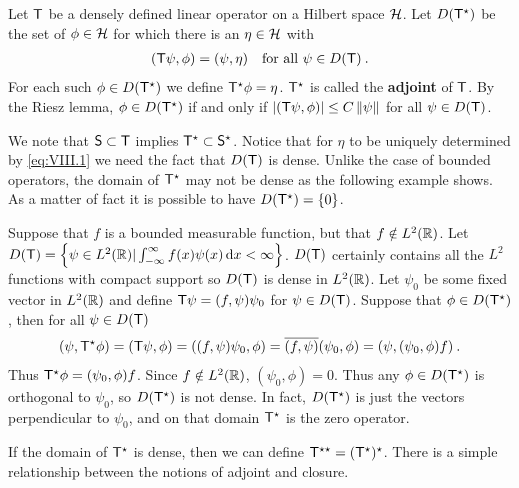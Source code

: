 \begin{definition}
Let $\mathsf{T}$ be a densely defined linear operator on a Hilbert space $\mathcal{H}$. Let $D(\mathsf{T}^\star)$ be the set of $\phi \in \mathcal{H}$ for which there is an $\eta \in \mathcal{H}$ with
\begin{align}
    (\mathsf{T} \psi, \phi) = (\psi, \eta) \quad \text{for all } \psi \in D(\mathsf{T}) \:. \label{eq:VIII.1}
\end{align}
For each such $\phi \in D(\mathsf{T}^\star)$ we define $\mathsf{T}^\star \phi = \eta$. $\mathsf{T}^\star$ is called the \textbf{adjoint} of $\mathsf{T}$. By the Riesz lemma, $\phi \in D(\mathsf{T}^\star)$ if and only if $|(\mathsf{T} \psi, \phi)| \leq C \left \Vert \psi \right \Vert$ for all $\psi \in D(\mathsf{T})$.
\end{definition}


We note that $\mathsf{S} \subset \mathsf{T}$ implies $\mathsf{T}^\star \subset \mathsf{S}^\star$. Notice that for $\eta$ to be uniquely determined by \eqref{eq:VIII.1} we need the fact that $D(\mathsf{T})$ is dense. Unlike the case of bounded operators, the domain of $\mathsf{T}^\star$ may not be dense as the following example shows. As a matter of fact it is possible to have $D(\mathsf{T}^\star) = \left \lbrace 0 \right \rbrace$.

\begin{example}
Suppose that $f$ is a bounded measurable function, but that $f \notin L^{2}(\mathbb{R})$. Let $D(\mathsf{T}) = \left \lbrace \psi \in L^{2}(\mathbb{R}) | \int_{-\infty}^{\infty} f(x) \psi(x) \, \mathrm{d} x < \infty   \right \rbrace$. $D(\mathsf{T})$ certainly contains all the $L^2$ functions with compact support so $D(\mathsf{T})$ is dense in $L^{2}(\mathbb{R})$. Let $\psi_0$ be some fixed vector in $L^{2}(\mathbb{R})$ and define $\mathsf{T} \psi = (f, \psi) \psi_0$ for $\psi \in D(\mathsf{T})$. Suppose that $\phi \in D(\mathsf{T}^\star)$, then for all $\psi \in D(\mathsf{T})$
\begin{align}
    (\psi, \mathsf{T}^\star \phi) = (\mathsf{T} \psi, \phi) = ((f, \psi) \psi_0, \phi) = \overline{(f, \psi)} (\psi_0, \phi) = (\psi, (\psi_0, \phi) f) \:. 
\end{align}
Thus $\mathsf{T}^\star \phi = (\psi_0, \phi) f$. Since $f \notin L^{2}(\mathbb{R})$, $(\psi_0, \phi) = 0$. Thus any $\phi \in D(\mathsf{T}^\star)$ is orthogonal to $\psi_0$, so $D(\mathsf{T}^\star)$ is not dense. In fact, $D(\mathsf{T}^\star)$ is just the vectors perpendicular to $\psi_0$, and on that domain $\mathsf{T}^\star$ is the zero operator.
\end{example}

If the domain of $\mathsf{T}^\star$ is dense, then we can define $\mathsf{T}^{\star \star} = (\mathsf{T}^\star)^\star$. There is a simple relationship between the notions of adjoint and closure.


